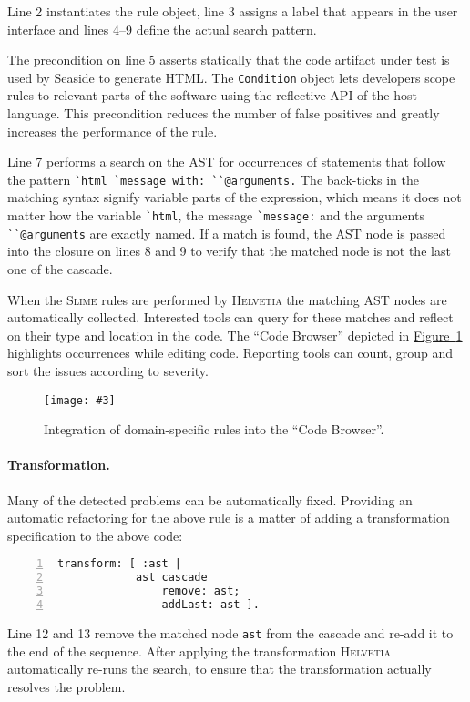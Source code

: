 \documentclass[10pt,twocolumn]{article}
\newcommand{\ct}{\lstinline[backgroundcolor=\color{white}]}
\newcommand{\fig}[4]{
	\begin{figure}[#1]
		\centering
		\texttt{[image: \#3]}
		\caption{\label{fig:#3}#4}
	\end{figure}}
\newcommand{\Slime}{\textsc{Slime}\xspace}
\newcommand{\Seaside}{Seaside\xspace}
\newcommand{\Helvetia}{\textsc{Helvetia}\xspace}
\newcommand{\figref}[1]{\hyperref[fig:#1]{Figure~\ref{fig:#1}}}
\begin{document}
Line 2 instantiates the rule object, line 3 assigns a label that appears in the user interface and lines 4--9 define the actual search pattern.

The precondition on line 5 asserts statically that the code artifact under test is used by \Seaside to generate HTML. The \ct{Condition} object lets developers scope rules to relevant parts of the software using the reflective API of the host language. This precondition reduces the number of false positives and greatly increases the performance of the rule.

Line 7 performs a search on the AST for occurrences of statements that follow the pattern \ct{`html `message with: ``@arguments.} The back-ticks in the matching syntax signify variable parts of the expression, which means it does not matter how the variable \ct{`html}, the message \ct{`message:} and the arguments \ct{``@arguments} are exactly named. If a match is found, the AST node is passed into the closure on lines 8 and 9 to verify that the matched node is not the last one of the cascade.

When the \Slime rules are performed by \Helvetia the matching AST nodes are automatically collected. Interested tools can query for these matches and reflect on their type and location in the code. The ``Code Browser'' depicted in \figref{lint} highlights occurrences while editing code. Reporting tools can count, group and sort the issues according to severity.

\fig{h!tb}{0.36}{lint}{Integration of domain-specific rules into the ``Code Browser''.}

\paragraph{Transformation.} Many of the detected problems can be automatically fixed. Providing an automatic refactoring for the above rule is a matter of adding a transformation specification to the above code:

\begin{lstlisting}[name=withHasToBeLastInCascade,numbers=left]
		transform: [ :ast |
			ast cascade
				remove: ast;
				addLast: ast ].
\end{lstlisting}

Line 12 and 13 remove the matched node \ct{ast} from the cascade and re-add it to the end of the sequence. After applying the transformation \Helvetia automatically re-runs the search, to ensure that the transformation actually resolves the problem. 
\end{document}
